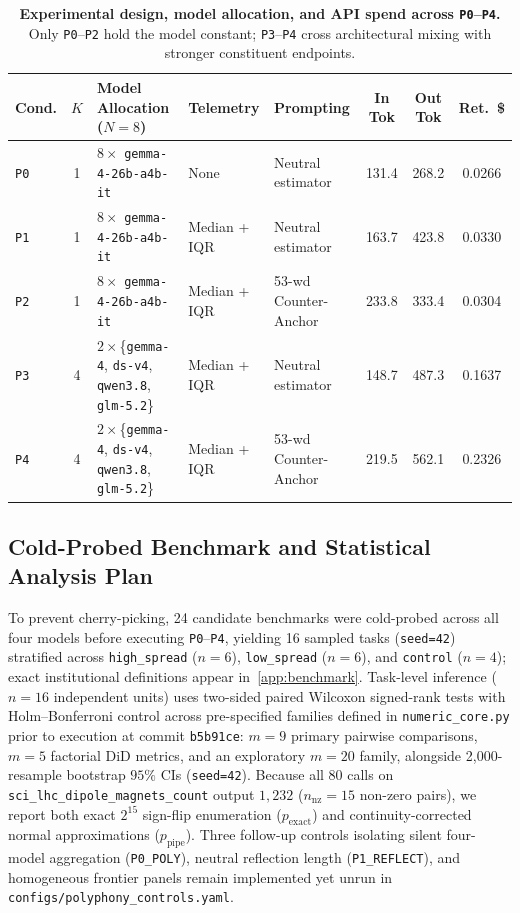 \documentclass[11pt,letterpaper]{article}
\theoremstyle{plain}
\newcommand{\code}[1]{\nolinkurl{#1}}
\newcommand{\taskid}[1]{\texttt{\small\hyphenpenalty=50 #1}}
\begin{document}
\begin{table}[t]
\centering
\caption{\textbf{Experimental design, model allocation, and API spend across \texttt{P0}--\texttt{P4}.} Only \texttt{P0}--\texttt{P2} hold the model constant; \texttt{P3}--\texttt{P4} cross architectural mixing with stronger constituent endpoints.}
\label{tab:conditions}
\footnotesize
\setlength{\tabcolsep}{4.5pt}
\begin{tabular}{@{}l c l l l S[table-format=3.1] S[table-format=3.1] S[table-format=1.4]@{}}
\toprule
\textbf{Cond.} & \textbf{$K$} & \textbf{Model Allocation ($N=8$)} & \textbf{Telemetry} & \textbf{Prompting} & \textbf{In Tok} & \textbf{Out Tok} & \textbf{Ret.\ \$} \\
\midrule
\texttt{P0} & 1 & $8\times$ \texttt{gemma-4-26b-a4b-it} & None & Neutral estimator & 131.4 & 268.2 & 0.0266 \\
\texttt{P1} & 1 & $8\times$ \texttt{gemma-4-26b-a4b-it} & Median + IQR & Neutral estimator & 163.7 & 423.8 & 0.0330 \\
\texttt{P2} & 1 & $8\times$ \texttt{gemma-4-26b-a4b-it} & Median + IQR & 53-wd Counter-Anchor & 233.8 & 333.4 & 0.0304 \\
\texttt{P3} & 4 & $2\times$\{\texttt{gemma-4}, \texttt{ds-v4}, \texttt{qwen3.8}, \texttt{glm-5.2}\} & Median + IQR & Neutral estimator & 148.7 & 487.3 & 0.1637 \\
\texttt{P4} & 4 & $2\times$\{\texttt{gemma-4}, \texttt{ds-v4}, \texttt{qwen3.8}, \texttt{glm-5.2}\} & Median + IQR & 53-wd Counter-Anchor & 219.5 & 562.1 & 0.2326 \\
\bottomrule
\end{tabular}
\end{table}

\subsection{Cold-Probed Benchmark and Statistical Analysis Plan}

To prevent cherry-picking, 24 candidate benchmarks were cold-probed across all four models before executing \texttt{P0}--\texttt{P4}, yielding 16 sampled tasks (\texttt{seed=42}) stratified across \code{high\_spread} ($n=6$), \code{low\_spread} ($n=6$), and \code{control} ($n=4$); exact institutional definitions appear in~\cref{app:benchmark}. Task-level inference ($n=16$ independent units) uses two-sided paired Wilcoxon signed-rank tests with Holm--Bonferroni control across pre-specified families defined in \code{numeric\_core.py} prior to execution at commit \texttt{b5b91ce}: $m=9$ primary pairwise comparisons, $m=5$ factorial DiD metrics, and an exploratory $m=20$ family, alongside 2,000-resample bootstrap $95\%$ CIs (\texttt{seed=42}). Because all 80 calls on \taskid{sci\_lhc\_dipole\_magnets\_count} output $1{,}232$ ($n_{\text{nz}}=15$ non-zero pairs), we report both exact $2^{15}$ sign-flip enumeration ($p_{\text{exact}}$) and continuity-corrected normal approximations ($p_{\text{pipe}}$). Three follow-up controls isolating silent four-model aggregation (\code{P0\_POLY}), neutral reflection length (\code{P1\_REFLECT}), and homogeneous frontier panels remain implemented yet unrun in \code{configs/polyphony\_controls.yaml}.
\end{document}
